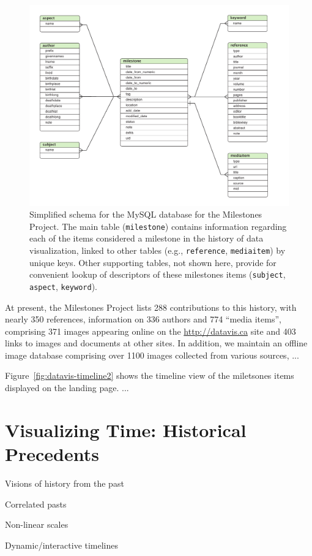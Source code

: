\documentclass[11pt]{article}
\newcommand*{\figref}[1]{Figure~\ref{#1}}
\begin{document}
\begin{figure}[!htb]
  \centering
  \includegraphics[width=\textwidth,clip]{fig/datavis-db-schema-reduced}
  \caption{Simplified schema for the MySQL database for the Milestones Project. The main 
  table (\texttt{milestone}) contains information regarding each of the items considered
  a milestone in the history of data visualization, linked to other tables 
  (e.g., \texttt{reference}, \texttt{mediaitem}) by unique keys.
  Other supporting tables, not shown here, provide for convenient lookup of 
  descriptors of these milestones items (\texttt{subject}, \texttt{aspect}, \texttt{keyword}).
  }
  \label{fig:datavis-db-schema}
\end{figure}


At present, the Milestones Project lists 288 contributions to this history, with nearly 350 references,
information on 336 authors and 774 ``media items'', comprising 371 images appearing online on the
\url{http://datavis.ca} site and 403 links to images and documents at other sites.
In addition, we maintain an offline image database comprising over 1100 images collected from
various sources, ...

\figref{fig:datavis-timeline2} shows the timeline view of the miletsones items displayed on the
landing page. ...

\section{Visualizing Time: Historical Precedents}\label{sec:vistime}
\begin{itemize*}
  \item Visions of history from the past
  \item Correlated pasts
  \item Non-linear scales
  \item Dynamic/interactive timelines
\end{itemize*}
\end{document}
